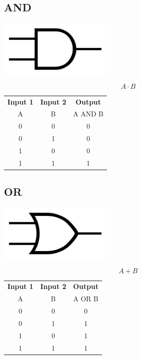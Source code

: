 \documentclass[11pt]{book}
\begin{document}
\subsection{AND}
\begin{center}
	\includegraphics{figures/20.02.png}
\end{center}
\begin{equation}
	A\cdot B
\end{equation}
\begin{center}
	\begin{tabular}{c c c}
		\textbf{Input 1} &  \textbf{Input 2} & \textbf{Output} \\
		A & B & A AND B \\
		0 & 0 & 0 \\
		0 & 1 & 0 \\
		1 & 0 & 0 \\
		1 & 1 & 1
	\end{tabular}
\end{center}

\newpage

\subsection{OR}
\begin{center}
	\includegraphics{figures/20.03.png}
\end{center}
\begin{equation}
	A + B
\end{equation}
\begin{center}
	\begin{tabular}{c c c}
		\textbf{Input 1} &  \textbf{Input 2} & \textbf{Output} \\
		A & B & A OR B \\
		0 & 0 & 0 \\
		0 & 1 & 1 \\
		1 & 0 & 1 \\
		1 & 1 & 1
	\end{tabular}
\end{center}
\end{document}
